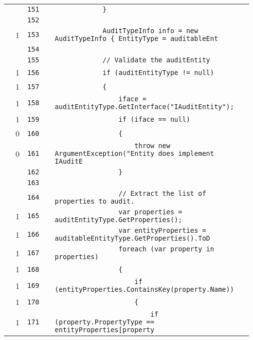 \documentclass[a4paper,10pt]{article}
\begin{document}
\begin{longtable}[l]{lrrll}
\cellcolor{gray} &  & \verb~151~ & & \verb~            }~\\
\cellcolor{gray} &  & \verb~152~ & & \verb~~\\
\cellcolor{green} & 1 & \verb~153~ & & \verb~            AuditTypeInfo info = new AuditTypeInfo { EntityType = auditableEnt~\\
\cellcolor{gray} &  & \verb~154~ & & \verb~~\\
\cellcolor{gray} &  & \verb~155~ & & \verb~            // Validate the auditEntity~\\
\cellcolor{green} & 1 & \verb~156~ & & \verb~            if (auditEntityType != null)~\\
\cellcolor{green} & 1 & \verb~157~ & & \verb~            {~\\
\cellcolor{green} & 1 & \verb~158~ & & \verb~                iface = auditEntityType.GetInterface("IAuditEntity");~\\
\cellcolor{green} & 1 & \verb~159~ & & \verb~                if (iface == null)~\\
\cellcolor{red} & 0 & \verb~160~ & & \verb~                {~\\
\cellcolor{red} & 0 & \verb~161~ & & \verb~                    throw new ArgumentException("Entity does implement IAuditE~\\
\cellcolor{gray} &  & \verb~162~ & & \verb~                }~\\
\cellcolor{gray} &  & \verb~163~ & & \verb~~\\
\cellcolor{gray} &  & \verb~164~ & & \verb~                // Extract the list of properties to audit.~\\
\cellcolor{green} & 1 & \verb~165~ & & \verb~                var properties = auditEntityType.GetProperties();~\\
\cellcolor{green} & 1 & \verb~166~ & & \verb~                var entityProperties = auditableEntityType.GetProperties().ToD~\\
\cellcolor{green} & 1 & \verb~167~ & & \verb~                foreach (var property in properties)~\\
\cellcolor{green} & 1 & \verb~168~ & & \verb~                {~\\
\cellcolor{green} & 1 & \verb~169~ & & \verb~                    if (entityProperties.ContainsKey(property.Name))~\\
\cellcolor{green} & 1 & \verb~170~ & & \verb~                    {~\\
\cellcolor{green} & 1 & \verb~171~ & & \verb~                        if (property.PropertyType == entityProperties[property~\\

\end{longtable}
\end{document}
